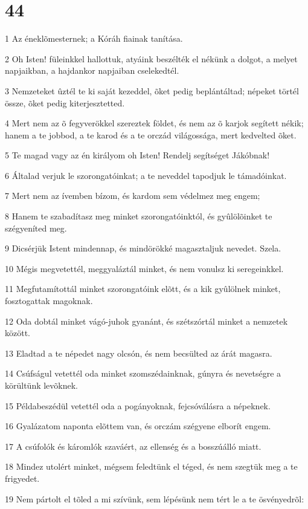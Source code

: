 \chapter{44}

\par 1 Az éneklõmesternek; a Kóráh fiainak tanítása.
\par 2 Oh Isten! füleinkkel hallottuk, atyáink beszélték el nékünk a dolgot, a melyet napjaikban, a hajdankor napjaiban cselekedtél.
\par 3 Nemzeteket ûztél te ki saját kezeddel, õket pedig beplántáltad; népeket törtél össze, õket pedig kiterjesztetted.
\par 4 Mert nem az õ fegyverökkel szereztek földet, és nem az õ karjok segített nékik; hanem a te jobbod, a te karod és a te orczád világossága, mert kedvelted õket.
\par 5 Te magad vagy az én királyom oh Isten! Rendelj segítséget Jákóbnak!
\par 6 Általad verjuk le szorongatóinkat; a te neveddel tapodjuk le támadóinkat.
\par 7 Mert nem az ívemben bízom, és kardom sem védelmez meg engem;
\par 8 Hanem te szabadítasz meg minket szorongatóinktól, és gyûlölõinket te szégyeníted meg.
\par 9 Dicsérjük Istent mindennap, és mindörökké magasztaljuk nevedet. Szela.
\par 10 Mégis megvetettél, meggyaláztál minket, és nem vonulsz ki seregeinkkel.
\par 11 Megfutamítottál minket szorongatóink elõtt, és a kik gyûlölnek minket, fosztogattak magoknak.
\par 12 Oda dobtál minket vágó-juhok gyanánt, és szétszórtál minket a nemzetek között.
\par 13 Eladtad a te népedet nagy olcsón, és nem becsülted az árát magasra.
\par 14 Csúfságul vetettél oda minket szomszédainknak, gúnyra és nevetségre a körültünk levõknek.
\par 15 Példabeszédül vetettél oda a pogányoknak, fejcsóválásra a népeknek.
\par 16 Gyalázatom naponta elõttem van, és orczám szégyene elborít engem.
\par 17 A csúfolók és káromlók szaváért, az ellenség és a bosszúálló miatt.
\par 18 Mindez utolért minket, mégsem feledtünk el téged, és nem szegtük meg a te frigyedet.
\par 19 Nem pártolt el tõled a mi szívünk, sem lépésünk nem tért le a te ösvényedrõl:
